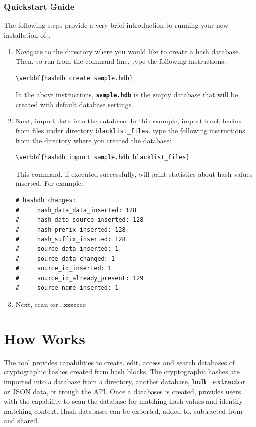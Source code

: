 \documentclass[11pt,fleqn]{article} %
\begin{document}
\subsubsection{Quickstart Guide}
The following steps provide a very brief introduction to running your new installation of \hdb. 
\begin{enumerate}
\item Navigate to the directory where you would like to create a hash database. Then, to run \hdb from the command line, type the following instructions: 
\begin{Verbatim}[commandchars=\\\{\}]
\verbbf{hashdb create sample.hdb}
\end{Verbatim} 

In the above instructions, \texttt{\textbf{sample.hdb}} is the empty database that will be created with default database settings.

\item Next, import data into the database. In this example, import
block hashes from files under directory \texttt{blacklist\_files}.
type the following instructions from the directory where you created the database:
\begin{Verbatim}[commandchars=\\\{\}]
\verbbf{hashdb import sample.hdb blacklist_files}
\end{Verbatim} 
This command, if executed successfully, will print statistics about hash values inserted. For example: 
\begingroup
\footnotesize
\begin{Verbatim}[fontfamily=courier]
# hashdb changes:
#     hash_data_data_inserted: 128
#     hash_data_source_inserted: 128
#     hash_prefix_inserted: 128
#     hash_suffix_inserted: 128
#     source_data_inserted: 1
#     source_data_changed: 1
#     source_id_inserted: 1
#     source_id_already_present: 129
#     source_name_inserted: 1

\end{Verbatim}
\endgroup

\item Next, scan for...zzzzzzz
\end{enumerate}

\section{How \hdb Works}
The \hdb tool provides capabilities to create, edit, access and search databases of cryptographic hashes created from hash blocks. The cryptographic hashes are imported into a database from a directory, another database, \textbf{bulk\_extractor} or JSON data, or trough the \hdb API.
Once a databases is created, \hdb provides users with the capability to scan the database for matching hash values and identify matching content. Hash databases can be exported, added to, subtracted from and shared.\\
\end{document}
